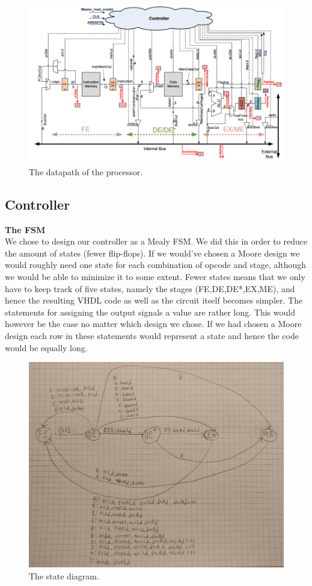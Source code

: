 \documentclass[a4paper,11pt]{article}
\begin{document}
\begin{figure}[h!]
  \centering
  \includegraphics[width=\linewidth]{datapath.png}
  \caption{The datapath of the processor.}
  \label{fig:datapath}
\end{figure} 

\newpage

\subsection{Controller}

\textbf{The FSM} \\
We chose to design our controller as a Mealy FSM. We did this in order to reduce the amount of states (fewer flip-flops). If we would've chosen a Moore design we would roughly need one state for each combination of opcode and stage, although we would be able to minimize it to some extent. Fewer states means that we only have to keep track of five states, namely the stages (FE,DE,DE*,EX,ME), and hence the resulting VHDL code as well as the circuit itself becomes simpler. The statements for assigning the output signals a value are rather long. This would however be the case no matter which design we chose. If we had chosen a Moore design each row in these statements would represent a state and hence the code would be equally long. 

\begin{figure}[h!]
  \centering
  \includegraphics[width=0.7\linewidth]{states.jpg}
  \caption{The state diagram.}
  \label{fig:etikett}
\end{figure}
\end{document}
